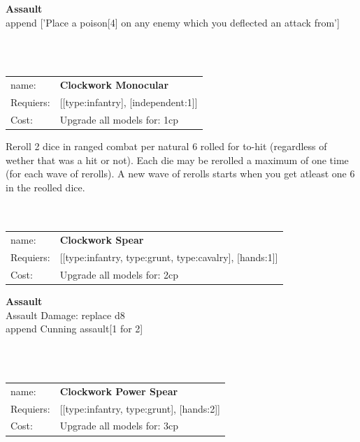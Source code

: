 {\bf Assault} \ \\

append ['Place a poison[4] on any enemy which you deflected an attack from']


\ \\
\ \\
\begin{tabular}{ll}
name: & {\bf Clockwork Monocular } \\
Requiers: & [[type:infantry], [independent:1]] \\
Cost: & Upgrade all models for: 1cp \\
\end{tabular}

Reroll 2 dice in ranged combat per natural 6 rolled for to-hit (regardless of wether that was a hit or not). Each die may be rerolled a maximum of one time (for each wave of rerolls). A new wave of rerolls starts when you get atleast one 6 in the reolled dice.\\ 









\ \\
\ \\
\begin{tabular}{ll}
name: & {\bf Clockwork Spear } \\
Requiers: & [[type:infantry, type:grunt, type:cavalry], [hands:1]] \\
Cost: & Upgrade all models for: 2cp \\
\end{tabular}





{\bf Assault} \ \\
Assault Damage: replace d8
\\ 

append Cunning assault[1 for 2]


\ \\
\ \\
\begin{tabular}{ll}
name: & {\bf Clockwork Power Spear } \\
Requiers: & [[type:infantry, type:grunt], [hands:2]] \\
Cost: & Upgrade all models for: 3cp \\
\end{tabular}





